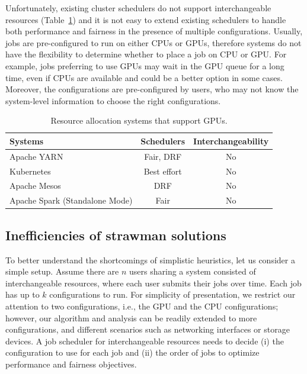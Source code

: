 Unfortunately, existing cluster schedulers do not support interchangeable resources (Table~\ref{tbl:schedulers}) and it is not easy to extend existing schedulers to handle both performance and fairness in the presence of multiple configurations.
Usually, jobs are pre-configured to run on either CPUs or GPUs, therefore systems do not have the flexibility to determine whether to place a job on CPU or GPU. For example, jobs preferring to use GPUs may wait in the GPU queue for a long time, even if CPUs are available and could be a better option in some cases.
Moreover, the configurations are pre-configured by users, who may not know the system-level information to choose the right configurations.


\begin{table}[h]	
	\caption{Resource allocation systems that support GPUs.}
	\label{tbl:schedulers}
	\begin{tabular}{|p{3.5cm}|c|c|}
		\hline
		Systems &  Schedulers & Interchangeability \\ \hline \hline		
		Apache YARN \cite{yarn}    & Fair, DRF & No    \\ \hline
		Kubernetes \cite{kubernetes} & Best effort & No \\ \hline
		Apache Mesos \cite{mesos}   &  DRF          & No  \\ \hline
		Apache Spark \newline (Standalone Mode) \cite{spark}   &  Fair         & No  \\ \hline
	\end{tabular}\vspace{-0.2in}
\end{table}




\subsection{Inefficiencies of strawman solutions}
\label{sec:perf-strawman}


To better understand the shortcomings of simplistic heuristics, let us consider a simple setup. 
Assume there are $n$ users sharing a system consisted of interchangeable resources, where each user submits their jobs over time. 
Each job has up to $k$ configurations to run. 
For simplicity of presentation, we restrict our attention to two configurations, i.e., the GPU and the CPU configurations; however, our algorithm and analysis can be readily extended to more configurations, and  different scenarios such as networking interfaces or storage devices. 
A job scheduler for interchangeable resources needs to decide 
(i) the configuration to use for each job and 
(ii) the order of jobs to optimize performance and fairness objectives. 

